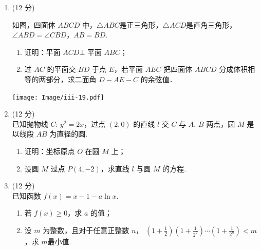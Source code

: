 \documentclass[12pt,space]{ctexart} %
\begin{document}
\begin{enumerate}[itemsep=-0.3em,topsep=0pt,resume]
  \item (12 分)\\[0.5em] 
    \begin{minipage}[h][20ex][t]{.55\textwidth}
      如图，四面体 $ABCD$ 中，$\triangle ABC$是正三角形，$\triangle ACD$是直角三角形，$\angle ABD=\angle CBD$，$AB=BD$.
      \begin{enumerate}[itemsep=-0.3em,label={(\arabic*)},topsep=0pt,labelsep=.5em,leftmargin=1.7em]
        \item 证明：平面 $ACD\bot $ 平面 $ABC$；
        \item 过 $AC$ 的平面交 $BD$ 于点 $E$，若平面 $AEC$ 把四面体 $ABCD$ 分成体积相等的两部分，求二面角 $D-AE-C$ 的余弦值．
      \end{enumerate}
    \end{minipage}
    \begin{minipage}[h][20ex][t]{.45\textwidth}
      \texttt{[image: Image/iii-19.pdf]}
    \end{minipage}\vspace{3em}

\item (12 分)\\
已知抛物线 $C\colon\, y^2=2x$，过点 $(2,0)$ 的直线 $l$ 交 $C$ 与 $A$, $B$ 两点，圆 $M$ 是以线段 $AB$ 为直径的圆.
\begin{enumerate}[itemsep=-0.3em,label={(\arabic*)},topsep=0pt,labelsep=.5em,leftmargin=1.7em]
	\item 证明：坐标原点 $O$ 在圆 $M$ 上；
	\item 设圆 $M$ 过点 $P(4,-2)$，求直线 $l$ 与圆 $M$ 的方程.
\end{enumerate}

\item (12 分)\\
已知函数 $f(x)=x-1-a\ln x$.
\begin{enumerate}[itemsep=-0.3em,label={(\arabic*)},topsep=0pt,labelsep=.5em,leftmargin=1.7em]
	\item 若 $f(x)\geqslant0$，求 $a$ 的值；
	\item 设 $m$ 为整数，且对于任意正整数 $n$， $\displaystyle{\left(1+\frac{1}{2}\right)\left(1+\frac{1}{2^2}\right)\cdots\left(1+\frac{1}{2^n}\right)<m}$，求 $m$最小值.
\end{enumerate}
\end{enumerate}
\end{document}
